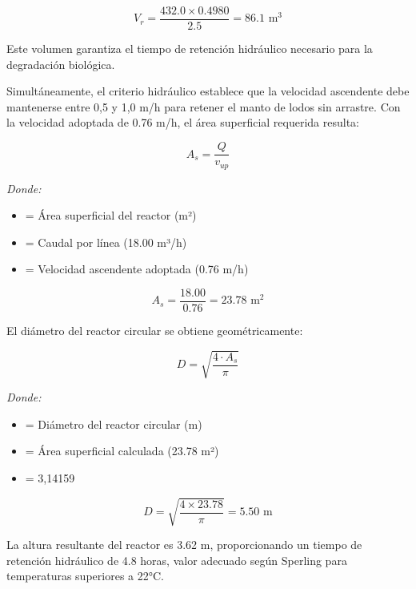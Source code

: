 \documentclass[12pt,a4paper]{article}
\begin{document}
\begin{equation}
V_r = \frac{432.0 \times 0.4980}{2.5} = 86.1 \text{ m}^3
\end{equation}

Este volumen garantiza el tiempo de retención hidráulico necesario para la degradación biológica.

Simultáneamente, el criterio hidráulico establece que la velocidad ascendente debe mantenerse entre 0,5 y 1,0 m/h para retener el manto de lodos sin arrastre. Con la velocidad adoptada de 0.76 m/h, el área superficial requerida resulta:

\begin{equation}
A_s = \frac{Q}{v_{up}}
\end{equation}

\textit{Donde:}
\begin{itemize}[noitemsep,leftmargin=2em]
    \item[$A_s$] = Área superficial del reactor (m²)
    \item[$Q$] = Caudal por línea (18.00 m³/h)
    \item[$v_{up}$] = Velocidad ascendente adoptada (0.76 m/h)
\end{itemize}

\begin{equation}
A_s = \frac{18.00}{0.76} = 23.78 \text{ m}^2
\end{equation}

El diámetro del reactor circular se obtiene geométricamente:

\begin{equation}
D = \sqrt{\frac{4 \cdot A_s}{\pi}}
\end{equation}

\textit{Donde:}
\begin{itemize}[noitemsep,leftmargin=2em]
    \item[$D$] = Diámetro del reactor circular (m)
    \item[$A_s$] = Área superficial calculada (23.78 m²)
    \item[$\pi$] = 3,14159
\end{itemize}

\begin{equation}
D = \sqrt{\frac{4 \times 23.78}{\pi}} = 5.50 \text{ m}
\end{equation}

La altura resultante del reactor es 3.62 m, proporcionando un tiempo de retención hidráulico de 4.8 horas, valor adecuado según Sperling \cite{sperling2007} para temperaturas superiores a 22°C.
\end{document}
